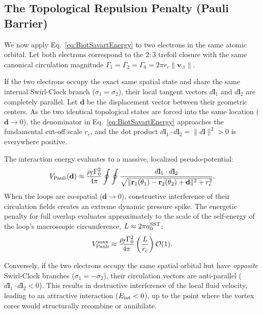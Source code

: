 \documentclass[10pt]{article}
\begin{document}
    \subsection{The Topological Repulsion Penalty (Pauli Barrier)}
        We now apply Eq.~\eqref{eq:BiotSavartEnergy} to two electrons in the same atomic orbital. Let both electrons correspond to the $2{:}3$ trefoil closure with the same canonical circulation magnitude $\Gamma_1 = \Gamma_2 = \Gamma_0 = 2\pi r_c \lVert\mathbf{v}_{\!\boldsymbol{\circlearrowleft}}\rVert$.
        
        If the two electrons occupy the exact same spatial state and share the same internal Swirl-Clock branch ($\sigma_1 = \sigma_2$), their local tangent vectors $d\mathbf{l}_1$ and $d\mathbf{l}_2$ are completely parallel. Let $\mathbf{d}$ be the displacement vector between their geometric centers. As the two identical topological states are forced into the same location ($\mathbf{d} \to 0$), the denominator in Eq.~\eqref{eq:BiotSavartEnergy} approaches the fundamental cut-off scale $r_c$, and the dot product $d\mathbf{l}_1 \cdot d\mathbf{l}_2 = \lVert d\mathbf{l} \rVert^2 > 0$ is everywhere positive.
        
        The interaction energy evaluates to a massive, localized pseudo-potential:
        \begin{equation}
            \label{eq:VPauli}
            V_{\rm Pauli}(\mathbf{d}) \approx \frac{\rho_{\!f} \Gamma_0^2}{4\pi} \oint \oint \frac{d\mathbf{l}_1 \cdot d\mathbf{l}_2}{\sqrt{\lVert \mathbf{r}_1(\theta_1) - \mathbf{r}_2(\theta_2) + \mathbf{d} \rVert^2 + r_c^2}}.
        \end{equation}
        When the loops are co-spatial ($\mathbf{d} \to 0$), constructive interference of their circulation fields creates an extreme dynamic pressure spike. The energetic penalty for full overlap evaluates approximately to the scale of the self-energy of the loop's macroscopic circumference, $L \approx 2\pi a_0^{\rm SST}$:
        \begin{equation}
            \label{eq:VPauli_Max}
            V_{\rm Pauli}^{\rm max} \approx \frac{\rho_{\!f} \Gamma_0^2}{4\pi} \left( \frac{L}{r_c} \right) \mathcal{O}(1).
        \end{equation}
        
        Conversely, if the two electrons occupy the same spatial orbital but have \emph{opposite} Swirl-Clock branches ($\sigma_1 = -\sigma_2$), their circulation vectors are anti-parallel ($d\mathbf{l}_1 \cdot d\mathbf{l}_2 < 0$). This results in destructive interference of the local fluid velocity, leading to an attractive interaction ($E_{\rm int} < 0$), up to the point where the vortex cores would structurally recombine or annihilate.
        
\end{document}
